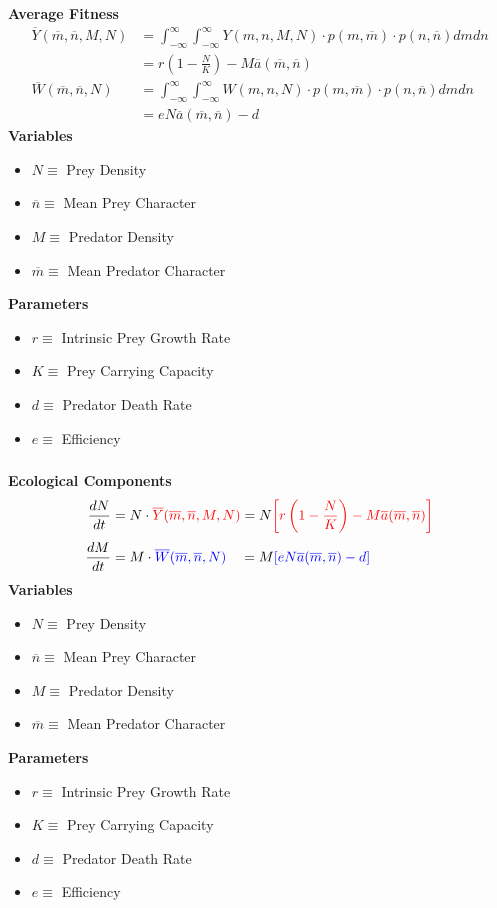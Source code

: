 \documentclass[10pt]{beamer}
\begin{document}
\begin{frame}
	\frametitle{}
	{\bf Average Fitness}
	\begin{align*}
	\overline{Y}(\overline{m}, \overline{n}, M, N) &= \int_{-\infty}^{\infty}\int_{-\infty}^{\infty} Y(m, n, M, N) \cdot p(m, \overline{m}) \cdot p(n, \overline{n}) dm dn \\
	&= r\left(1 - \frac{N}{K}\right) - M\overline{a}(\overline{m}, \overline{n}) \\[.1cm]
	\overline{W}(\overline{m}, \overline{n}, N) &= \int_{-\infty}^{\infty}\int_{-\infty}^{\infty} W(m, n, N) \cdot p(m, \overline{m}) \cdot p(n, \overline{n}) dm dn \\
	&= eN\overline{a}(\overline{m}, \overline{n}) - d
	\end{align*}
	{\bf Variables}
	\begin{itemize}
		\item $N \equiv $ Prey Density
		\item $\overline{n} \equiv $ Mean Prey Character
		\item $M \equiv $ Predator Density
		\item $\overline{m} \equiv $ Mean Predator Character
	\end{itemize}
	{\bf Parameters}
	\begin{itemize}
		\item $r \equiv $ Intrinsic Prey Growth Rate
		\item $K \equiv $ Prey Carrying Capacity
		\item $d \equiv $ Predator Death Rate
		\item $e \equiv $ Efficiency
	\end{itemize}
\end{frame}
\begin{frame}
	\frametitle{}
	{\bf Ecological Components}
	\begin{align*}
		\frac{dN}{dt} &= N\cdot {\color{red}\overline{Y}(\overline{m}, \overline{n}, M, N)}= N{\color{red}\left[r\left(1 - \frac{N}{K}\right) - M\overline{a}(\overline{m}, \overline{n})\right]}\\[.1cm]
		\frac{dM}{dt} &= M\cdot {\color{blue}\overline{W}(\overline{m}, \overline{n}, N)}\ \ \ = M{\color{blue}\left[eN\overline{a}(\overline{m}, \overline{n}) - d\right]}
	\end{align*}
	{\bf Variables}
	\begin{itemize}
		\item $N \equiv $ Prey Density
		\item $\overline{n} \equiv $ Mean Prey Character
		\item $M \equiv $ Predator Density
		\item $\overline{m} \equiv $ Mean Predator Character
	\end{itemize}
	{\bf Parameters}
	\begin{itemize}
		\item $r \equiv $ Intrinsic Prey Growth Rate
		\item $K \equiv $ Prey Carrying Capacity
		\item $d \equiv $ Predator Death Rate
		\item $e \equiv $ Efficiency
	\end{itemize}
\end{frame}
\end{document}
